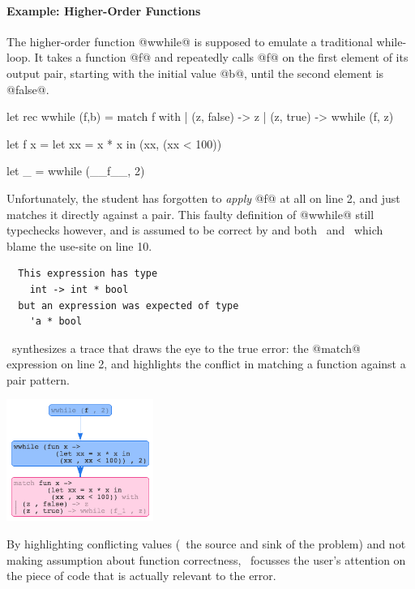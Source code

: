 \paragraph{Example: Higher-Order Functions}
%
The higher-order function @wwhile@ is supposed
to emulate a traditional while-loop. It takes
a function @f@ and repeatedly calls @f@ on the
first element of its output pair, starting with
the initial value @b@, until the second element
is @false@.
%
\begin{ecode}
  let rec wwhile (f,b) =
    match f with
    | (z, false) -> z
    | (z, true)  -> wwhile (f, z)

  let f x =
    let xx = x * x in
    (xx, (xx < 100))

  let _ = wwhile (__f__, 2)
\end{ecode}
%
Unfortunately, the student has forgotten to \emph{apply}
@f@ at all on line 2, and just matches it directly against
a pair.
This faulty definition of @wwhile@ still typechecks however,
and is assumed to be correct by and both \ocaml\
and \sherrloc\ which blame the use-site on line 10.
%
\begin{verbatim}
  This expression has type
    int -> int * bool
  but an expression was expected of type
    'a * bool
\end{verbatim}
%
\toolname\ synthesizes a trace that draws the eye to the
true error: the @match@ expression on line 2, and highlights
the conflict in matching a function against a pair pattern.
%
\begin{center}
  \includegraphics[height=150px]{wwhile.png}
\end{center}
%
By highlighting conflicting values (\ie\ the source and sink
of the problem) and not making assumption about function correctness, \toolname\
focusses the user's attention on the piece of code that is
actually relevant to the error.


